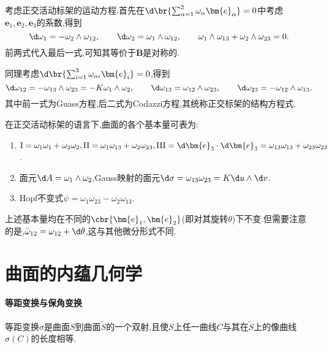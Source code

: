 \documentclass{article}
\begin{document}
考虑正交活动标架的运动方程.首先在$\d\br{\sum_{\alpha=1}^2 \omega_\alpha\bm{e}_\alpha}=0$中考虑$\bm{e}_1,\bm{e}_2,\bm{e}_3$的系数,得到
$$\d \omega_1=-\omega_2\wedge\omega_{12},\qquad \d \omega_2=\omega_1\wedge\omega_{12},\qquad \omega_1\wedge\omega_{13}+\omega_2\wedge\omega_{23}=0.$$
前两式代入最后一式,可知其等价于$\bm{B}$是对称的.

同理考虑$\d\br{\sum_{i=1}^3\omega_{\alpha i}\bm{e}_i}=0$,得到
$$\d \omega_{12}=-\omega_{13}\wedge\omega_{23}=-K\omega_1\wedge\omega_2,\qquad \d\omega_{13}=\omega_{12}\wedge\omega_{23},\qquad \d\omega_{23}=-\omega_{12}\wedge\omega_{13}.$$
其中前一式为Guass方程,后二式为Codazzi方程,其统称正交标架的结构方程式.

在正交活动标架的语言下,曲面的各个基本量可表为:\begin{enumerate}
    \item $\mathrm{I}=\omega_1\omega_1+\omega_2\omega_2,\mathrm{II}=\omega_1\omega_{13}+\omega_{2}\omega_{23},\mathrm{III}=\d\bm{e}_3\cdot\d\bm{e}_3=\omega_{13}\omega_{13}+\omega_{23}\omega_{23}$.
    \item 面元$\d A=\omega_1\wedge\omega_2$,Gauss映射的面元$\d\sigma=\omega_{13}\omega_{23}=K\d u\wedge\d v$.
    \item Hopf不变式$\psi=\omega_1\omega_{23}-\omega_{2}\omega_{13}$.
\end{enumerate}
上述基本量均在不同的$\cbr{\bm{e}_1,\bm{e}_2}$(即对其旋转$\theta$)下不变.但需要注意的是,$\bar{\omega}_{12}=\omega_{12}+\d \theta$,这与其他微分形式不同.

\section{曲面的内蕴几何学}
\paragraph{等距变换与保角变换}
等距变换$\sigma$是曲面$S$到曲面$\tilde{S}$的一个双射,且使$S$上任一曲线$C$与其在$\tilde{S}$上的像曲线$\sigma(C)$的长度相等.
\end{document}
